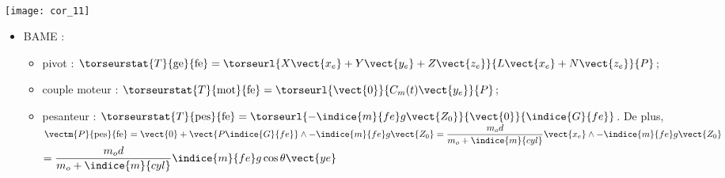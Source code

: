 \ifprof 
\begin{corrige} ~\\
\begin{minipage}[c]{.35\linewidth}
\begin{center}
\texttt{[image: cor\_11]}
\end{center}
\end{minipage}\hfill
\begin{minipage}[c]{.6\linewidth}
\begin{itemize}
\item BAME : 
\begin{itemize}
\item pivot : $\torseurstat{T}{\text{ge}}{\text{fe}} = \torseurl{X\vect{x_e}+Y\vect{y_e}+Z\vect{z_e}}{L\vect{x_e}+N\vect{z_e}}{P}$;
\item couple moteur : $\torseurstat{T}{\text{mot}}{\text{fe}} = \torseurl{\vect{0}}{C_m(t)\vect{y_e}}{P}$;
\item pesanteur : $\torseurstat{T}{\text{pes}}{\text{fe}} = \torseurl{-\indice{m}{fe}g\vect{Z_0}}{\vect{0}}{\indice{G}{fe}}$. De plus, 
$\vectm{P}{\text{pes}}{\text{fe}} = \vect{0} + \vect{P\indice{G}{fe}}\wedge -\indice{m}{fe}g\vect{Z_0} =  \dfrac{m_od}{m_o+\indice{m}{cyl}}\vect{x_e} \wedge -\indice{m}{fe}g\vect{Z_0} $  $= \dfrac{m_od}{m_o+\indice{m}{cyl}}\indice{m}{fe}g\cos\theta \vect{ye} $
\end{itemize}
\end{itemize}
\end{minipage}
\end{corrige}
\else
\fi

\ifprof
\begin{corrige}
\end{corrige}
\else
\fi

\ifprof
\begin{corrige}


\end{corrige}
\else
\fi

